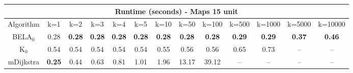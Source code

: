 \begin{tabular}{c|cccccccccccc}\toprule
\multicolumn{13}{c}{Runtime (seconds) - Maps 15 unit}\\ \midrule
Algorithm & k=1 & k=2 & k=3 & k=4 & k=5 & k=10 & k=50 & k=100 & k=500 & k=1000 & k=5000 & k=10000 \\ \midrule
BELA$_0$ & 0.28 & \textbf{0.28} & \textbf{0.28} & \textbf{0.28} & \textbf{0.28} & \textbf{0.28} & \textbf{0.28} & \textbf{0.28} & \textbf{0.29} & \textbf{0.29} & \textbf{0.37} & \textbf{0.46} \\
K$_0$ & 0.54 & 0.54 & 0.54 & 0.54 & 0.54 & 0.55 & 0.56 & 0.56 & 0.65 & 0.73 & -- & -- \\
mDijkstra & \textbf{0.25} & 0.44 & 0.63 & 0.81 & 1.01 & 1.96 & 13.17 & 39.12 & -- & -- & -- & -- \\ \bottomrule 
\end{tabular}
